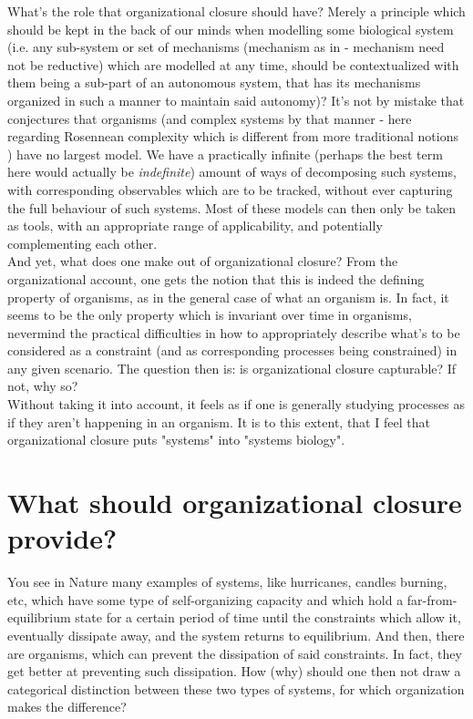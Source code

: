 \documentclass[a4paper,12pt,twoside,leqno]{article}
\begin{document}
What's the role that organizational closure should have? Merely a principle which should be kept in the back of our minds when modelling some biological system (i.e. any sub-system or set of mechanisms (mechanism as in \cite{bich2021mechanism, bechtel2011mechanism} - mechanism need not be reductive) which are modelled at any time, should be contextualized with them being a sub-part of an autonomous system, that has its mechanisms organized in such a manner to maintain said autonomy)? It's not by mistake that \cite{rosen1991life} conjectures that organisms (and complex systems by that manner - here regarding Rosennean complexity which is different from more traditional notions \citep{rosen1991life}) have no largest model. We have a practically infinite (perhaps the best term here would actually be \textit{indefinite}) amount of ways of decomposing such systems, with corresponding observables which are to be tracked, without ever capturing the full behaviour of such systems. Most of these models can then only be taken as tools, with an appropriate range of applicability, and potentially complementing each other.\\
And yet, what does one make out of organizational closure? From the organizational account, one gets the notion that this is indeed the defining property of organisms, as in the general case of what an organism is. In fact, it seems to be the only property which is invariant over time in organisms, nevermind the practical difficulties in how to appropriately describe what's to be considered as a constraint (and as corresponding processes being constrained) in any given scenario. The question then is: is organizational closure capturable? If not, why so?\\
Without taking it into account, it feels as if one is generally studying processes as if they aren't happening in an organism. It is to this extent, that I feel that organizational closure puts "systems" into "systems biology".

\section{What should organizational closure provide?}

You see in Nature many examples of systems, like hurricanes, candles burning, etc, which have some type of self-organizing capacity and which hold a far-from-equilibrium state for a certain period of time until the constraints which allow it, eventually dissipate away, and the system returns to equilibrium. And then, there are organisms, which can prevent the dissipation of said constraints. In fact, they get better at preventing such dissipation. How (why) should one then not draw a categorical distinction between these two types of systems, for which organization makes the difference?
\end{document}
